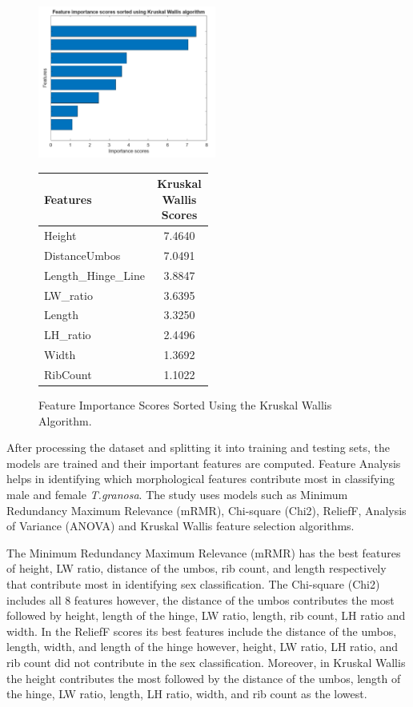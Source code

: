 \begin{figure}[!htbp]
	\centering
	\begin{minipage}{0.48\textwidth} 
		\centering
		\includegraphics[width=\textwidth, height=5cm]{figures/kw.png} 
	\end{minipage}%
	\hfill 
	\begin{minipage}{0.48\textwidth} 
		\centering
		{\fontsize{10}{12}\selectfont 
			\begin{tabular}{p{0.5\linewidth}c}
				\hline
				\textbf{Features} & \textbf{Kruskal Wallis Scores}   \\ \hline
				Height              & 7.4640  \\
				DistanceUmbos       & 7.0491  \\
				Length\_Hinge\_Line & 3.8847  \\
				LW\_ratio           & 3.6395  \\
				Length              & 3.3250 \\ 
				LH\_ratio           & 2.4496 \\
				Width               & 1.3692 \\
				RibCount            & 1.1022 \\
				\hline
			\end{tabular}
		}
	\end{minipage}
	\caption{Feature Importance Scores Sorted Using the Kruskal Wallis Algorithm.}
	\label{fig:kw-combined}
\end{figure}


After processing the dataset and splitting it into training and testing sets, the models are trained and their important features are computed. Feature Analysis helps in identifying which morphological features contribute most in classifying male and female \textit{T.granosa}. The study uses models such as Minimum Redundancy Maximum Relevance (mRMR), Chi-square (Chi2), ReliefF, Analysis of Variance (ANOVA) and Kruskal Wallis feature selection algorithms. 

The Minimum Redundancy Maximum Relevance (mRMR) has the best features of height, LW ratio, distance of the umbos, rib count, and length respectively that contribute most in identifying sex classification. The Chi-square (Chi2) includes all 8 features however, the distance of the umbos contributes the most followed by height, length of the hinge, LW ratio, length, rib count, LH ratio and width. In the ReliefF scores its best features include the distance of the umbos, length, width, and length of the hinge however, height, LW ratio, LH ratio, and rib count did not contribute in the sex classification. Moreover, in Kruskal Wallis the height contributes the most followed by the distance of the umbos, length of the hinge, LW ratio, length, LH ratio, width, and rib count as the lowest. 


